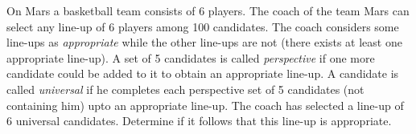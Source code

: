 On Mars a basketball team consists of 6 players. The coach of the team Mars can select any line-up of 6 players among 100 candidates. The coach considers some line-ups as \textit{appropriate} while the other line-ups are not (there exists at least one appropriate line-up). A set of 5 candidates is called \textit{perspective} if one more candidate could be added to it to obtain an appropriate line-up. A candidate is called \textit{universal} if he completes each perspective set of 5 candidates (not containing him) upto an appropriate line-up. The coach has selected a line-up of 6 universal candidates. Determine if it follows that this line-up is appropriate.